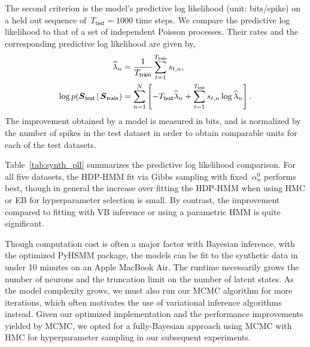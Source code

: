 The second criterion is the model's predictive log likelihood (unit:
bits/spike) on a held out sequence of~${T_{\mathsf{test}}=1000}$ time steps. We
compare the predictive log likelihood to that of a set of independent
Poisson processes. Their rates and the corresponding predictive log
likelihood are given by,
\begin{align}
\widehat{\lambda}_n 
  &=\frac{1}{T_{\mathsf{train}}}\sum_{t=1}^{T_{\mathsf{train}}} s_{t,n}, \\
  \log p(\boldsymbol{S}_{\mathsf{test}} \,|\, \boldsymbol{S}_{\mathsf{train}}) &= \sum_{n=1}^N \left[ -T_{\mathsf{test}} \widehat{\lambda}_n + \sum_{t=1}^{T_{\mathsf{test}}} s_{t,n} \log \widehat{\lambda}_n  \right].
\end{align}
The improvement obtained by a model is measured in bits, and is
normalized by the number of spikes in the test dataset in order to
obtain comparable units for each of the test datasets.

Table~\ref{tab:synth_pll} summarizes the predictive log likelihood
comparison.  For all five datasets, the HDP-HMM fit via Gibbs sampling
with fixed~$\alpha_n^0$ performs best, though in general the increase
over fitting the HDP-HMM when using HMC or EB for hyperparameter
selection is small. By contrast, the improvement compared to fitting
with VB inference or using a parametric HMM is quite significant.

Though computation cost is often a major factor with Bayesian
inference, with the optimized PyHSMM package, the models can be fit to
the synthetic data in under 10 minutes on an Apple MacBook Air. The
runtime necessarily grows the number of neurons and the truncation
limit on the number of latent states. As the model complexity grows,
we must also run our MCMC algorithm for more iterations, which often
motivates the use of variational inference algorithms instead. Given
our optimized implementation and the performance improvements yielded
by MCMC, we opted for a fully-Bayesian approach using MCMC with HMC
for hyperparameter sampling in our subsequent experiments.


